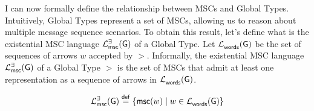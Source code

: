 



I can now formally define the relationship between MSCs and Global Types. 
Intuitively, Global Types represent a set of MSCs, allowing us to reason 
about multiple message sequence scenarios. To obtain this result, let's 
define what is the existential MSC language $\mathcal{L}_{\mathsf{msc}}^{\exists}(\mathsf{G}){}$ 
of a Global Type. Let $\mathcal{L}_{\mathsf{words}}^{}(\mathsf{G})$ be the set of
sequences of arrows $w$ accepted by $\gt$.
Informally, the existential MSC language $\mathcal{L}_{\mathsf{msc}}^{\exists}(\mathsf{G}){}$ of a 
Global Type $\gt$ is the set of MSCs that admit at least one representation as a
sequence of arrows in $\mathcal{L}_{\mathsf{words}}^{}(\mathsf{G})$.
\begin{definition}[$\existentialmsclanguageof{\gt}$]
	$$
		\existentialmsclanguageof{\gt} \eqdef \{\labeltomsc{w} \mid
		w \in \labellanguageof{\gt}\} %
	$$
\end{definition}

